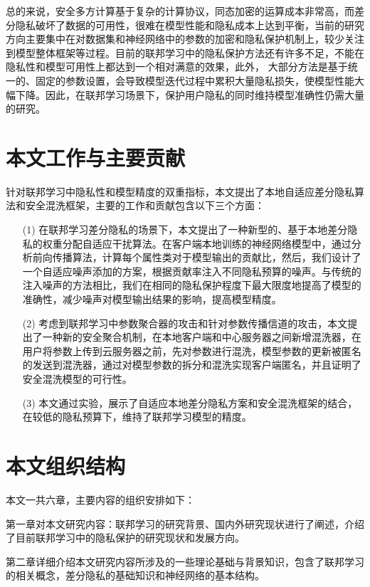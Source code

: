 总的来说，安全多方计算基于复杂的计算协议，同态加密的运算成本非常高，而差分隐私破坏了数据的可用性，很难在模型性能和隐私成本上达到平衡，当前的研究方向主要集中在对数据集和神经网络中的参数的加密和隐私保护机制上，较少关注到模型整体框架等过程。目前的联邦学习中的隐私保护方法还有许多不足，不能在隐私性和模型可用性上都达到一个相对满意的效果，此外， 大部分方法是基于统一的、固定的参数设置，会导致模型迭代过程中累积大量隐私损失，使模型性能大幅下降。因此，在联邦学习场景下，保护用户隐私的同时维持模型准确性仍需大量的研究。

\section{本文工作与主要贡献}
针对联邦学习中隐私性和模型精度的双重指标，本文提出了本地自适应差分隐私算法和安全混洗框架，主要的工作和贡献包含以下三个方面：
\begin{enumerate}
\item [(1)] 在联邦学习差分隐私的场景下，本文提出了一种新型的、基于本地差分隐私的权重分配自适应干扰算法。在客户端本地训练的神经网络模型中，通过分析前向传播算法，计算每个属性类对于模型输出的贡献比，然后，我们设计了一个自适应噪声添加的方案，根据贡献率注入不同隐私预算的噪声。与传统的注入噪声的方法相比，我们在相同的隐私保护程度下最大限度地提高了模型的准确性，减少噪声对模型输出结果的影响，提高模型精度。
\item [(2)] 考虑到联邦学习中参数聚合器的攻击和针对参数传播信道的攻击，本文提出了一种新的安全聚合机制，在本地客户端和中心服务器之间新增混洗器，在用户将参数上传到云服务器之前，先对参数进行混洗，模型参数的更新被匿名的发送到混洗器，通过对模型参数的拆分和混洗实现客户端匿名，并且证明了安全混洗模型的可行性。
\item [(3)] 本文通过实验，展示了自适应本地差分隐私方案和安全混洗框架的结合，在较低的隐私预算下，维持了联邦学习模型的精度。
\end{enumerate}

\section{本文组织结构}

本文一共六章，主要内容的组织安排如下：

第一章对本文研究内容：联邦学习的研究背景、国内外研究现状进行了阐述，介绍了目前联邦学习中的隐私保护的研究现状和发展方向。

第二章详细介绍本文研究内容所涉及的一些理论基础与背景知识，包含了联邦学习的相关概念，差分隐私的基础知识和神经网络的基本结构。


